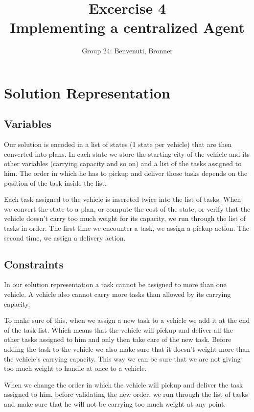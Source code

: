 \documentclass[11pt]{article}
\title{\bf Excercise 4\\ Implementing a centralized Agent}
\author{Group 24: Benvenuti, Bronner}
\begin{document}
\maketitle

\section{Solution Representation}

\subsection{Variables}
Our solution is encoded in a list of states (1 state per vehicle) that are then converted into plans. In each state we store the starting city of the vehicle and its other variables (carrying capacity and so on) and a list of the tasks assigned to him. The order in which he has to pickup and deliver those tasks depends on the position of the task inside the list.

Each task assigned to the vehicle is insereted twice into the list of tasks. When we convert the state to a plan, or compute the cost of the state, or verify that the vehicle doesn't carry too much weight for its capacity, we run through the list of tasks in order. The first time we encounter a task, we assign a pickup action. The second time, we assign a delivery action. 

\subsection{Constraints}
In our solution representation a task cannot be assigned to more than one vehicle. A vehicle also cannot carry more tasks than allowed by its carrying capacity.

To make sure of this, when we assign a new task to a vehicle we add it at the end of the task list. Which means that the vehicle will pickup and deliver all the other tasks assigned to him and only then take care of the new task. Before adding the task to the vehicle we also make sure that it doesn't weight more than the vehicle's carrying capacity. This way we can be sure that we are not giving too much weight to handle at once to a vehicle.

When we change the order in which the vehicle will pickup and deliver the task assigned to him, before validating the new order, we run through the list of tasks and make sure that he will not be carrying too much weight at any point.
\end{document}
